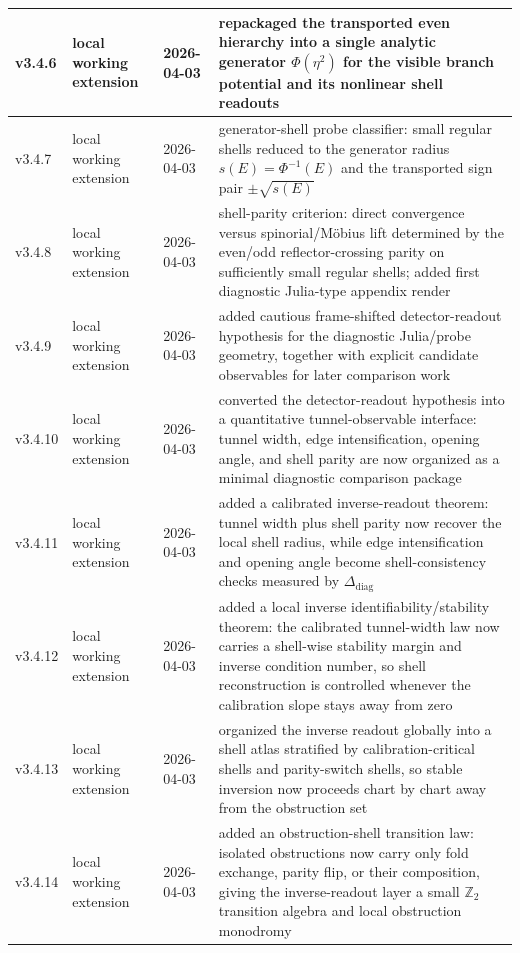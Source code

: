 {\begin{longtable}{|p{}|p{}|p{}|p{}|}
\hline
v3.4.6 & local working extension & 2026-04-03 & repackaged the transported even hierarchy into a single analytic generator $\Phi(\eta^2)$ for the visible branch potential and its nonlinear shell readouts \\
\hline
v3.4.7 & local working extension & 2026-04-03 & generator-shell probe classifier: small regular shells reduced to the generator radius $s(E)=\Phi^{-1}(E)$ and the transported sign pair $\pm\sqrt{s(E)}$ \\
\hline
v3.4.8 & local working extension & 2026-04-03 & shell-parity criterion: direct convergence versus spinorial/M\"obius lift determined by the even/odd reflector-crossing parity on sufficiently small regular shells; added first diagnostic Julia-type appendix render \\
\hline
v3.4.9 & local working extension & 2026-04-03 & added cautious frame-shifted detector-readout hypothesis for the diagnostic Julia/probe geometry, together with explicit candidate observables for later comparison work \\
\hline
v3.4.10 & local working extension & 2026-04-03 & converted the detector-readout hypothesis into a quantitative tunnel-observable interface: tunnel width, edge intensification, opening angle, and shell parity are now organized as a minimal diagnostic comparison package \\
\hline
v3.4.11 & local working extension & 2026-04-03 & added a calibrated inverse-readout theorem: tunnel width plus shell parity now recover the local shell radius, while edge intensification and opening angle become shell-consistency checks measured by $\Delta_{\mathrm{diag}}$ \\
\hline
v3.4.12 & local working extension & 2026-04-03 & added a local inverse identifiability/stability theorem: the calibrated tunnel-width law now carries a shell-wise stability margin and inverse condition number, so shell reconstruction is controlled whenever the calibration slope stays away from zero \\
\hline
v3.4.13 & local working extension & 2026-04-03 & organized the inverse readout globally into a shell atlas stratified by calibration-critical shells and parity-switch shells, so stable inversion now proceeds chart by chart away from the obstruction set \\
\hline
v3.4.14 & local working extension & 2026-04-03 & added an obstruction-shell transition law: isolated obstructions now carry only fold exchange, parity flip, or their composition, giving the inverse-readout layer a small $\mathbb Z_2$ transition algebra and local obstruction monodromy \\

\end{longtable}}
